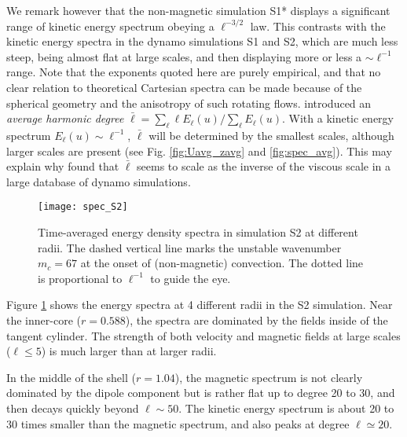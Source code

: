 \documentclass[12pt, a4paper]{article}
\begin{document}
We remark however that the non-magnetic simulation S1* displays a significant range of kinetic energy spectrum obeying a $\ell^{-3/2}$ law.
This contrasts with the kinetic energy spectra in the dynamo simulations S1 and S2, which are much less steep, being almost flat at large scales, and then displaying more or less a $\sim \ell^{-1}$ range.
Note that the exponents quoted here are purely empirical, and that no clear relation to theoretical Cartesian spectra can be made because of the spherical geometry and the anisotropy of such rotating flows.
\citet{christensen2006} introduced an \textit{average harmonic degree} $\bar{\ell} = \sum_\ell {\ell E_\ell(u)}/\sum_\ell {E_\ell(u)}$.
With a kinetic energy spectrum $E_\ell(u) \sim \ell^{-1}$, $\bar{\ell}$ will be determined by the smallest scales, although larger scales are present (see Fig. \ref{fig:Uavg_zavg} and \ref{fig:spec_avg}).
This may explain why \citet{king2013} found that $\bar{\ell}$ seems to scale as the inverse of the viscous scale in a large database of dynamo simulations.



\begin{figure}
\begin{center}
\texttt{[image: spec\_S2]}
\caption{Time-averaged energy density spectra in simulation S2 at different radii.
The dashed vertical line marks the unstable wavenumber $m_c=67$ at the onset of (non-magnetic) convection.
The dotted line is proportional to $\ell^{-1}$ to guide the eye.}
\label{fig:spec_S2}
\end{center}
\end{figure}

Figure \ref{fig:spec_S2} shows the energy spectra at 4 different radii in the S2 simulation.
Near the inner-core ($r=0.588$), the spectra are dominated by the fields inside of the tangent cylinder.
The strength of both velocity and magnetic fields at large scales ($\ell \leq 5$) is much larger than at larger radii.

In the middle of the shell ($r=1.04$), the magnetic spectrum is not clearly dominated by the dipole component but is rather flat up to degree 20 to 30, and then decays quickly beyond $\ell \sim 50$.
The kinetic energy spectrum is about 20 to 30 times smaller than the magnetic spectrum, and also peaks at degree $\ell \simeq 20$.
\end{document}
